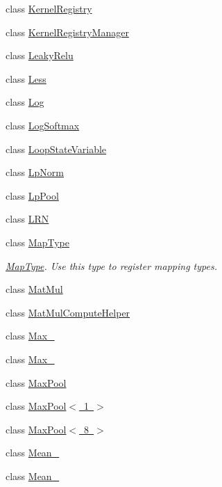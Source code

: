 \begin{DoxyCompactItemize}
class \mbox{\hyperlink{classonnxruntime_1_1KernelRegistry}{Kernel\+Registry}}
\item 
class \mbox{\hyperlink{classonnxruntime_1_1KernelRegistryManager}{Kernel\+Registry\+Manager}}
\item 
class \mbox{\hyperlink{classonnxruntime_1_1LeakyRelu}{Leaky\+Relu}}
\item 
class \mbox{\hyperlink{classonnxruntime_1_1Less}{Less}}
\item 
class \mbox{\hyperlink{classonnxruntime_1_1Log}{Log}}
\item 
class \mbox{\hyperlink{classonnxruntime_1_1LogSoftmax}{Log\+Softmax}}
\item 
class \mbox{\hyperlink{classonnxruntime_1_1LoopStateVariable}{Loop\+State\+Variable}}
\item 
class \mbox{\hyperlink{classonnxruntime_1_1LpNorm}{Lp\+Norm}}
\item 
class \mbox{\hyperlink{classonnxruntime_1_1LpPool}{Lp\+Pool}}
\item 
class \mbox{\hyperlink{classonnxruntime_1_1LRN}{L\+RN}}
\item 
class \mbox{\hyperlink{classonnxruntime_1_1MapType}{Map\+Type}}
\begin{DoxyCompactList}\small\item\em \mbox{\hyperlink{classonnxruntime_1_1MapType}{Map\+Type}}. Use this type to register mapping types. \end{DoxyCompactList}\item 
class \mbox{\hyperlink{classonnxruntime_1_1MatMul}{Mat\+Mul}}
\item 
class \mbox{\hyperlink{classonnxruntime_1_1MatMulComputeHelper}{Mat\+Mul\+Compute\+Helper}}
\item 
class \mbox{\hyperlink{classonnxruntime_1_1Max__6}{Max\+\_}}
\item 
class \mbox{\hyperlink{classonnxruntime_1_1Max__8}{Max\+\_}}
\item 
class \mbox{\hyperlink{classonnxruntime_1_1MaxPool}{Max\+Pool}}
\item 
class \mbox{\hyperlink{classonnxruntime_1_1MaxPool_3_011_01_4}{Max\+Pool$<$ 1 $>$}}
\item 
class \mbox{\hyperlink{classonnxruntime_1_1MaxPool_3_018_01_4}{Max\+Pool$<$ 8 $>$}}
\item 
class \mbox{\hyperlink{classonnxruntime_1_1Mean__6}{Mean\+\_}}
\item 
class \mbox{\hyperlink{classonnxruntime_1_1Mean__8}{Mean\+\_}}
\item 

\end{DoxyCompactItemize}
